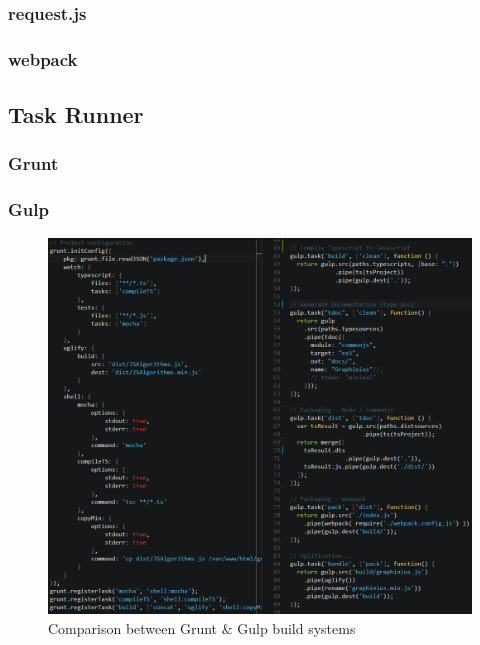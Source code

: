 		\subsubsection{request.js}
		\label{sssect:request_js}
		
		\subsubsection{webpack}
		\label{sssect:webpack}


	\subsection{Task Runner}
	\label{ssect:build_system}
	
		\subsubsection{Grunt}
		\label{sssect:grunt}
		
		\subsubsection{Gulp}
		\label{sssect:gulp}
		
		\begin{figure}[ht]
			\label{fig_grunt_gulp}
			\centering
			\hspace*{-1.4cm}
			\includegraphics[width=1.2\textwidth]{figures/grunt_gulp_comparison}
			\caption{Comparison between Grunt \& Gulp build systems}
		\end{figure}
		

